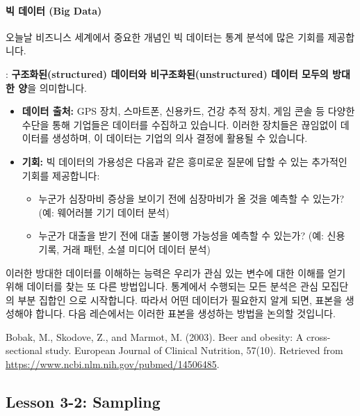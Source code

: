 \documentclass[11pt,a4paper]{article}
\theoremstyle{definition}
\begin{document}
\paragraph{빅 데이터 (Big Data)}
오늘날 비즈니스 세계에서 중요한 개념인 빅 데이터는 통계 분석에 많은 기회를 제공합니다.

\begin{tcolorbox}[infobox, title={빅 데이터 (Big Data)}]
: \textbf{구조화된(structured) 데이터와 비구조화된(unstructured) 데이터 모두의 방대한 양}을 의미합니다.
\end{tcolorbox}

\begin{itemize}
    \item \textbf{데이터 출처:} GPS 장치, 스마트폰, 신용카드, 건강 추적 장치, 게임 콘솔 등 다양한 수단을 통해 기업들은 데이터를 수집하고 있습니다. 이러한 장치들은 끊임없이 데이터를 생성하며, 이 데이터는 기업의 의사 결정에 활용될 수 있습니다.
    \item \textbf{기회:} 빅 데이터의 가용성은 다음과 같은 흥미로운 질문에 답할 수 있는 추가적인 기회를 제공합니다:
    \begin{itemize}
        \item 누군가 심장마비 증상을 보이기 전에 심장마비가 올 것을 예측할 수 있는가? (예: 웨어러블 기기 데이터 분석)
        \item 누군가 대출을 받기 전에 대출 불이행 가능성을 예측할 수 있는가? (예: 신용 기록, 거래 패턴, 소셜 미디어 데이터 분석)
    \end{itemize}
\end{itemize}
이러한 방대한 데이터를 이해하는 능력은 우리가 관심 있는 변수에 대한 이해를 얻기 위해 데이터를 찾는 또 다른 방법입니다. 통계에서 수행되는 모든 분석은 관심 모집단의 부분 집합인 으로 시작합니다. 따라서 어떤 데이터가 필요한지 알게 되면, 표본을 생성해야 합니다. 다음 레슨에서는 이러한 표본을 생성하는 방법을 논의할 것입니다.

\begin{tcolorbox}[infobox, title={학술 인용 (Academic Citation)}]
Bobak, M., Skodove, Z., and Marmot, M. (2003). Beer and obesity: A cross-sectional study. European Journal of Clinical Nutrition, 57(10). Retrieved from \url{https://www.ncbi.nlm.nih.gov/pubmed/14506485}.
\end{tcolorbox}

\newpage
\subsection{Lesson 3-2: Sampling}
\end{document}
